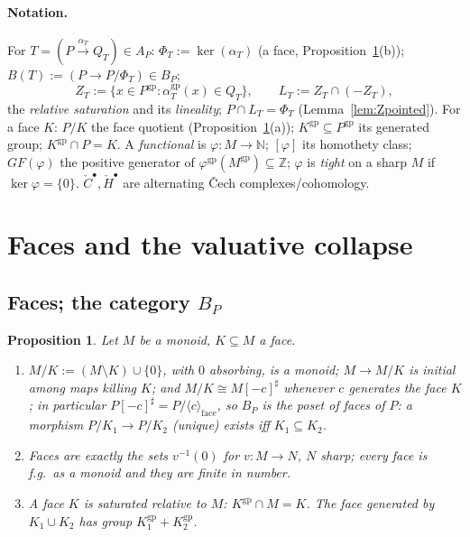 \documentclass[11pt]{article}
\newtheorem{proposition}[theorem]{Proposition}
\theoremstyle{definition}
\newcommand{\gp}{\mathrm{gp}}
\newcommand{\HH}{\check{H}}
\newcommand{\cC}{\check{C}}
\newcommand{\Z}{\mathbb{Z}}
\begin{document}
\paragraph{Notation.} For $T=(P\xrightarrow{\alpha_T}Q_T)\in A_P$:
$\Phi_T:=\ker(\alpha_T)$ (a face, Proposition~\ref{prop:bp}(b));
$B(T):=(P\to P/\Phi_T)\in B_P$;
\[
Z_T:=\{x\in P^{\gp}:\alpha_T^{\gp}(x)\in Q_T\},\qquad
L_T:=Z_T\cap(-Z_T),
\]
the \emph{relative saturation}
and its \emph{lineality};
$P\cap L_T=\Phi_T$ (Lemma~\ref{lem:Zpointed}). For a face $K$: $P/K$
the face quotient (Proposition~\ref{prop:bp}(a));
$K^{\gp}\subseteq P^{\gp}$ its generated group; $K^{\gp}\cap P=K$.
A \emph{functional} is $\varphi:M\to\mathbb N$; $[\varphi]$ its
homothety class; ${GF}(\varphi)$ the positive generator of
$\varphi^{\gp}(M^{\gp})\subseteq\Z$; $\varphi$ is \emph{tight} on a
sharp $M$ if $\ker\varphi=\{0\}$. $\cC^\bullet,\HH^\bullet$ are
alternating \v{C}ech complexes/cohomology.

\section{Faces and the valuative collapse}\label{sec:collapse}

\subsection{Faces; the category $B_P$}

\begin{proposition}\label{prop:bp}
Let $M$ be a monoid, $K\subseteq M$ a face.
\begin{enumerate}[label=\textup{(\alph*)},leftmargin=1.8em]
\item $M/K:=(M\setminus K)\cup\{0\}$, with $0$ absorbing, is a monoid;
$M\to M/K$ is initial among maps killing $K$; and
$M/K\cong M[-c]^{\sharp}$ whenever $c$ generates the face $K$; 
in
particular $P[-c]^{\sharp}=P/\langle c\rangle_{\mathrm{face}}$, so
$B_P$ is the poset of faces of $P$: a morphism $P/K_1\to P/K_2$
\textup{(}unique\textup{)} exists iff $K_1\subseteq K_2$.
\item Faces are exactly the sets $v^{-1}(0)$ for $v:M\to N$, $N$
sharp; every face is f.g.\ as a monoid and they are finite in number.
\item A face $K$ is saturated relative to $M$: $K^{\gp}\cap M=K$. The
face generated by $K_1\cup K_2$ has group $K_1^{\gp}+K_2^{\gp}$.
\end{enumerate}
\end{proposition}
\end{document}
